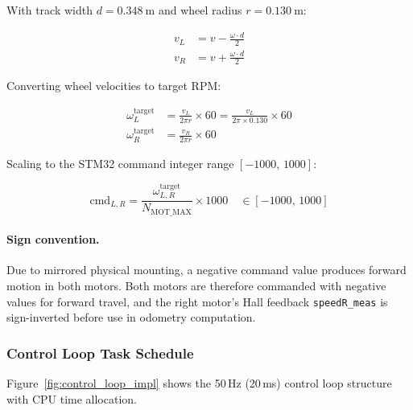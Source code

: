 \documentclass[12pt,a4paper]{report}
\begin{document}
With track width $d = \SI{0.348}{\metre}$ and wheel radius
$r = \SI{0.130}{\metre}$:

\begin{align}
  v_L &= v - \frac{\omega \cdot d}{2} \label{eq:vl_impl}\\
  v_R &= v + \frac{\omega \cdot d}{2} \label{eq:vr_impl}
\end{align}

Converting wheel velocities to target RPM:

\begin{align}
  \omega_L^\text{target} &= \frac{v_L}{2\pi r} \times 60
  = \frac{v_L}{2\pi \times 0.130} \times 60 \label{eq:rpm_l_impl}\\
  \omega_R^\text{target} &= \frac{v_R}{2\pi r} \times 60 \label{eq:rpm_r_impl}
\end{align}

Scaling to the STM32 command integer range $[-1000,\,1000]$:

\begin{equation}
  \text{cmd}_{L,R} = \frac{\omega_{L,R}^\text{target}}{N_\text{MOT\_MAX}}
  \times 1000 \quad \in [-1000,\,1000]
  \label{eq:cmd_scale_impl}
\end{equation}

\paragraph{Sign convention.}
Due to mirrored physical mounting, a negative command value produces forward
motion in both motors. Both motors are therefore commanded with negative values
for forward travel, and the right motor's Hall feedback \texttt{speedR\_meas}
is sign-inverted before use in odometry computation.

\subsubsection{Control Loop Task Schedule}
\label{subsec:control_loop_impl}

Figure~\ref{fig:control_loop_impl} shows the 50\,Hz (20\,ms) control loop structure
with CPU time allocation.
\end{document}
